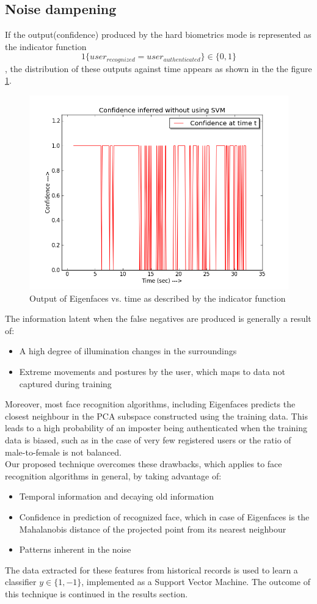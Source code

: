 \documentclass[%
        submission,
        notitlepage,
        narroweqnarray,
        inline,
        ]{ieee}
\begin{document}
\subsection{Noise dampening}
If the output(confidence) produced by the hard biometrics mode is represented as the indicator function
$$ 1\{user_{recognized} = user_{authenticated}\} \in \{0,1\}$$,
the distribution of these outputs against time appears as shown in the the figure \ref{fig:no_svm}.
\begin{figure}[h!]
	\centering
	\includegraphics[scale=0.4]{img/no_svm.png}
	\caption{Output of Eigenfaces vs. time as described by the indicator function}
	\label{fig:no_svm}
\end{figure}
The information latent when the false negatives are produced is generally a result of:
\begin{itemize}
	\item A high degree of illumination changes in the surroundings
	\item Extreme movements and postures by the user, which maps to data not captured during training
\end{itemize}
Moreover, most face recognition algorithms, including Eigenfaces predicts the closest neighbour in the PCA subspace constructed using the training data.
This leads to a high probability of an imposter being authenticated when the training data is biased, such as in the case of very few registered users or the ratio of male-to-female is not balanced.\\
Our proposed technique overcomes these drawbacks, which applies to face recognition algorithms in general, by taking advantage of:
\begin{itemize}
	\item Temporal information and decaying old information
	\item Confidence in prediction of recognized face, which in case of Eigenfaces is the Mahalanobis distance of the projected point from its nearest neighbour
	\item Patterns inherent in the noise
\end{itemize}
The data extracted for these features from historical records is used to learn a classifier $y \in \{1,-1\}$, implemented as a Support Vector Machine. The outcome of this technique is continued in the results section.
\end{document}
